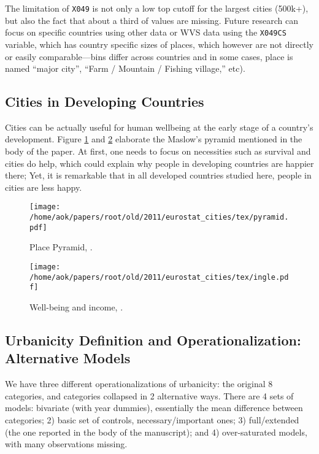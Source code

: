 \documentclass[11pt, letterpaper]{article}
\begin{document}
\begin{spacing}{1.4}
The limitation of \texttt{X049} is not only a low top cutoff for the largest cities (500k+), but also the fact that about a third of values are missing. Future research can focus on specific countries using other data or WVS data using the \texttt{X049CS} variable, which has country specific sizes of places, which however are not directly or easily comparable---bins differ across countries and in some cases, place is named
``major city'', ``Farm / Mountain / Fishing village,'' etc). 


\subsection*{Cities in Developing Countries}

Cities can be actually useful for human wellbeing at the early stage of a
country's development. Figure \ref{pyramid} and \ref{ingle} elaborate the
Maslow's pyramid mentioned in the body of the paper. At first, one needs to
focus on necessities such as survival and cities do help, which could explain
why people in developing countries are happier there; Yet, it is remarkable that
in all developed countries studied here, people in cities are less happy.

\begin{figure}[H]
\begin{centering}
 \texttt{[image: /home/aok/papers/root/old/2011/eurostat\_cities/tex/pyramid.pdf]}
 \caption{Place Pyramid, \citep[p 294]{florida08}.} \label{pyramid}
  \end{centering}
\end{figure}

\begin{figure}[H]
\begin{centering}
 \texttt{[image: /home/aok/papers/root/old/2011/eurostat\_cities/tex/ingle.pdf]}
 \caption{Well-being and income, \citep{inglehart97}.} \label{ingle}
  \end{centering}
\end{figure}


\subsection*{Urbanicity Definition and Operationalization: Alternative Models} 

We have three different operationalizations of urbanicity: the original 8
categories, and categories collapsed in 2 alternative ways. There are 4 sets of
models: bivariate (with year dummies), essentially the mean difference between
categories; 2) basic set of controls, necessary/important ones; 3)
full/extended (the one reported in the body of the manuscript); and 4) over-saturated models,
with many observations missing. 


\end{spacing}
\end{document}
